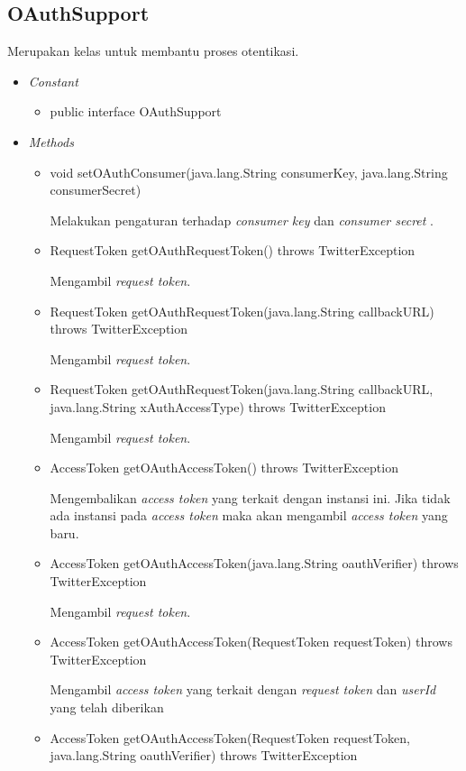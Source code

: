 	\subsection{OAuthSupport}
	Merupakan kelas untuk membantu proses otentikasi.
	\begin{itemize}
		\item \textit{Constant}
		
			\begin{itemize}
				\item public interface OAuthSupport
			\end{itemize}
		\item \textit{Methods}
		
		\begin{itemize}
			\item void setOAuthConsumer(java.lang.String consumerKey, java.lang.String consumerSecret)
			
			Melakukan pengaturan terhadap \textit{consumer key} dan \textit{consumer secret }.
			\item RequestToken getOAuthRequestToken() throws TwitterException
			
			Mengambil \textit{request token}.
			\item RequestToken getOAuthRequestToken(java.lang.String callbackURL) throws TwitterException
			
			
			Mengambil \textit{request token}.
			\item RequestToken getOAuthRequestToken(java.lang.String callbackURL, java.lang.String xAuthAccessType) throws TwitterException
			
			Mengambil \textit{request token}.
			\item AccessToken getOAuthAccessToken() throws TwitterException
			
			Mengembalikan \textit{access token} yang terkait dengan instansi ini. Jika tidak ada instansi pada \textit{access token} maka akan mengambil \textit{access token} yang baru.
			\item AccessToken getOAuthAccessToken(java.lang.String oauthVerifier) throws TwitterException
			
			Mengambil \textit{request token}.
			\item AccessToken getOAuthAccessToken(RequestToken requestToken) throws TwitterException
			
			Mengambil \textit{access token} yang terkait dengan \textit{request token }dan \textit{userId} yang telah diberikan
			\item AccessToken getOAuthAccessToken(RequestToken requestToken, java.lang.String oauthVerifier) throws TwitterException
			

\end{itemize}
\end{itemize}
